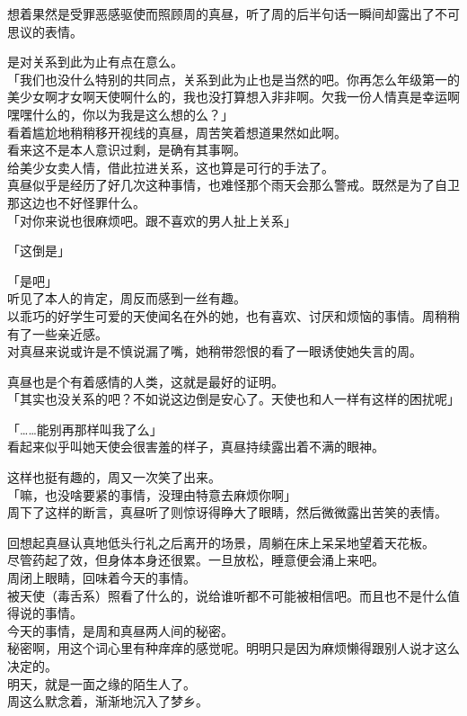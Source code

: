 想着果然是受罪恶感驱使而照顾周的真昼，听了周的后半句话一瞬间却露出了不可思议的表情。

是对关系到此为止有点在意么。\\

「我们也没什么特别的共同点，关系到此为止也是当然的吧。你再怎么年级第一的美少女啊才女啊天使啊什么的，我也没打算想入非非啊。欠我一份人情真是幸运啊嘿嘿什么的，你以为我是这么想的么？」\\

看着尴尬地稍稍移开视线的真昼，周苦笑着想道果然如此啊。\\

看来这不是本人意识过剩，是确有其事啊。\\

给美少女卖人情，借此拉进关系，这也算是可行的手法了。\\

真昼似乎是经历了好几次这种事情，也难怪那个雨天会那么警戒。既然是为了自卫那这边也不好怪罪什么。\\

「对你来说也很麻烦吧。跟不喜欢的男人扯上关系」

「这倒是」

「是吧」\\

听见了本人的肯定，周反而感到一丝有趣。\\

以乖巧的好学生可爱的天使闻名在外的她，也有喜欢、讨厌和烦恼的事情。周稍稍有了一些亲近感。\\

对真昼来说或许是不慎说漏了嘴，她稍带怨恨的看了一眼诱使她失言的周。

真昼也是个有着感情的人类，这就是最好的证明。\\

「其实也没关系的吧？不如说这边倒是安心了。天使也和人一样有这样的困扰呢」

「……能别再那样叫我了么」\\

看起来似乎叫她天使会很害羞的样子，真昼持续露出着不满的眼神。

这样也挺有趣的，周又一次笑了出来。\\

「嘛，也没啥要紧的事情，没理由特意去麻烦你啊」\\

周下了这样的断言，真昼听了则惊讶得睁大了眼睛，然后微微露出苦笑的表情。\\

\vspace{2\baselineskip}

回想起真昼认真地低头行礼之后离开的场景，周躺在床上呆呆地望着天花板。\\

尽管药起了效，但身体本身还很累。一旦放松，睡意便会涌上来吧。\\

周闭上眼睛，回味着今天的事情。\\

被天使（毒舌系）照看了什么的，说给谁听都不可能被相信吧。而且也不是什么值得说的事情。\\

今天的事情，是周和真昼两人间的秘密。\\

秘密啊，用这个词心里有种痒痒的感觉呢。明明只是因为麻烦懒得跟别人说才这么决定的。\\

明天，就是一面之缘的陌生人了。\\

周这么默念着，渐渐地沉入了梦乡。
